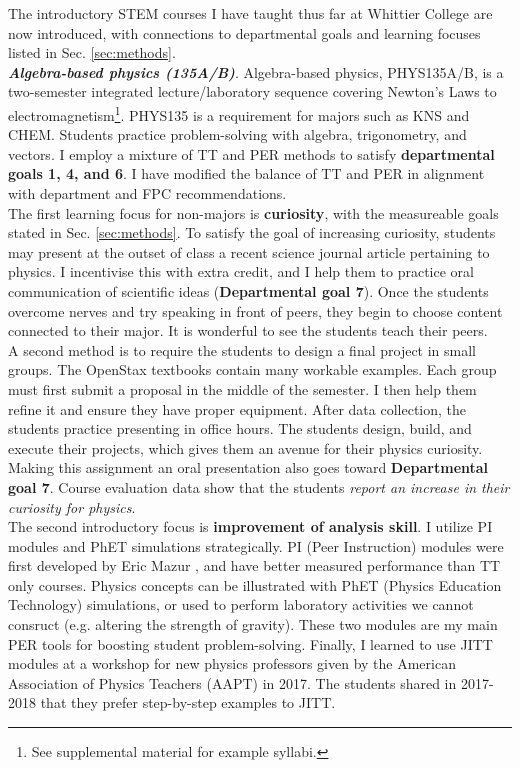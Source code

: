 \documentclass[../../../main.tex]{subfiles}
\begin{document}
The introductory STEM courses I have taught thus far at Whittier College are now introduced, with connections to departmental goals and learning focuses listed in Sec. \ref{sec:methods}.
\\
\vspace{0.25cm}
\textbf{\textit{Algebra-based physics (135A/B)}}. Algebra-based physics, PHYS135A/B, is a two-semester integrated lecture/laboratory sequence covering Newton's Laws to electromagnetism\footnote{See supplemental material for example syllabi.}.  PHYS135 is a requirement for majors such as KNS and CHEM.  Students practice problem-solving with algebra, trigonometry, and vectors.  I employ a mixture of TT and PER methods to satisfy \textbf{departmental goals 1, 4, and 6}.  I have modified the balance of TT and PER in alignment with department and FPC recommendations.
\\
\vspace{0.25cm}
The first learning focus for non-majors is \textbf{curiosity}, with the measureable goals stated in Sec. \ref{sec:methods}.  To satisfy the goal of increasing curiosity, students may present at the outset of class a recent science journal article pertaining to physics.  I incentivise this with extra credit, and I help them to practice oral communication of scientific ideas (\textbf{Departmental goal 7}).  Once the students overcome nerves and try speaking in front of peers, they begin to choose content connected to their major.  It is wonderful to see the students teach their peers.
\\
\vspace{0.25cm}
A second method is to require the students to design a final project in small groups.  The OpenStax textbooks contain many workable examples.  Each group must first submit a proposal in the middle of the semester.  I then help them refine it and ensure they have proper equipment.  After data collection, the students practice presenting in office hours.  The students design, build, and execute their projects, which gives them an avenue for their physics curiosity.  Making this assignment an oral presentation also goes toward \textbf{Departmental goal 7}.  Course evaluation data show that the students \textit{report an increase in their curiosity for physics}.
\\
\vspace{0.25cm}
The second introductory focus is \textbf{improvement of analysis skill}.  I utilize PI modules and PhET simulations strategically.  PI (Peer Instruction) modules were first developed by Eric Mazur \cite{mazur2013peer}, and have better measured performance than TT only courses.  Physics concepts can be illustrated with PhET (Physics Education Technology) simulations, or used to perform laboratory activities we cannot consruct (e.g. altering the strength of gravity)\cite{phet}.  These two modules are my main PER tools for boosting student problem-solving.  Finally, I learned to use JITT modules \cite{jitt} at a workshop for new physics professors given by the American Association of Physics Teachers (AAPT) in 2017.  The students shared in 2017-2018 that they prefer step-by-step examples to JITT.
\end{document}
